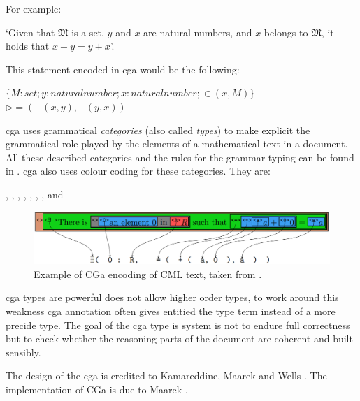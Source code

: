 For example:

\begin{center}
`Given that $\mathfrak{M}$ is a set, $y$ and $x$ are natural numbers, and $x$ belongs to $\mathfrak{M}$, it holds that $x+ y=y+x$'.
\end{center}

This statement encoded in \gls{cga} would be the following:

\begin{center}
$\{M : set; y : natural number; x : natural number; \in(x, M)\}$\\
$\rhd =(+(x, y), +(y, x)) $
\end{center}

\Gls{cga} uses grammatical \emph{categories} (also called \emph{types}) to make explicit the grammatical role played by the elements of a mathematical text in a document.
All these described categories and the rules for the grammar typing can be found in \cite{wtt}. \Gls{cga} also uses colour coding for these categories. They are:

\begin{center}
, , , , , , ,  and 
\end{center}

\begin{figure}[H]
\begin{center}
\includegraphics[scale=0.35]{Figures/Background/cgaannotatedtext.png}
\end{center}
\caption{Example of CGa encoding of CML text, taken from \cite{KAMAREDDINE20085}. \label{fig:cgannotated}}
\end{figure}

\Gls{cga} types are powerful does not allow higher order types, to work around this weakness \gls{cga} annotation often gives entitied the type term instead of a more precide type. The goal of the \gls{cga} type is system is not to endure full correctness but to check whether the reasoning parts of the document are coherent and built sensibly. 

The design of the \gls{cga} is credited to Kamareddine, Maarek and Wells  \cite{oomathlang}. The implementation of CGa is due to Maarek \cite{manuelphd}.

